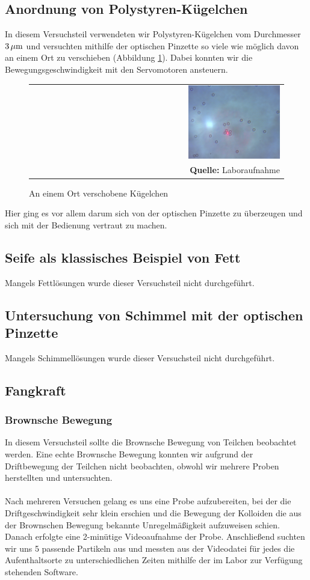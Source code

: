 \documentclass[a4paper,titlepage]{scrartcl}
\numberwithin{equation}{section}
\begin{document}
\subsection{Anordnung von Polystyren-Kügelchen}
In diesem Versuchsteil verwendeten wir Polystyren-Kügelchen vom Durchmesser $\unit[3]{\mu m}$ und versuchten mithilfe der optischen Pinzette so viele wie möglich davon an einem Ort zu verschieben (Abbildung \ref{fig:laboraufnahme3}). Dabei konnten wir die Bewegungsgeschwindigkeit mit den Servomotoren ansteuern.
\begin{figure}[H]
	\centering
	\begin{tabular}{@{}r@{}}
		\includegraphics[width=0.37\textwidth]{images/teilchengruppe.png}\\
		\footnotesize\sffamily\textbf{Quelle:} Laboraufnahme
	\end{tabular}
	\caption{An einem Ort verschobene Kügelchen}
    \label{fig:laboraufnahme3}
\end{figure}
Hier ging es vor allem darum sich von der optischen Pinzette zu überzeugen und sich mit der Bedienung vertraut zu machen.
\subsection{Seife als klassisches Beispiel von Fett}
Mangels Fettlösungen wurde dieser Versuchsteil nicht durchgeführt.
\subsection{Untersuchung von Schimmel mit der optischen Pinzette}
Mangels Schimmellösungen wurde dieser Versuchsteil nicht durchgeführt.
\subsection{Fangkraft}
\subsubsection{Brownsche Bewegung}
In diesem Versuchsteil sollte die Brownsche Bewegung von Teilchen beobachtet werden. Eine echte Brownsche Bewegung konnten wir aufgrund der Driftbewegung der Teilchen nicht beobachten, obwohl wir mehrere Proben herstellten und untersuchten.\\ \\
Nach mehreren Versuchen gelang es uns eine Probe aufzubereiten, bei der die Driftgeschwindigkeit sehr klein erschien und die Bewegung der Kolloiden die aus der Brownschen Bewegung bekannte Unregelmäßigkeit aufzuweisen schien. Danach erfolgte eine 2-minütige Videoaufnahme der Probe. Anschließend suchten wir uns 5 passende Partikeln aus und messten aus der Videodatei für jedes die Aufenthaltsorte zu unterschiedlichen Zeiten mithilfe der im Labor zur Verfügung stehenden Software.
\end{document}
